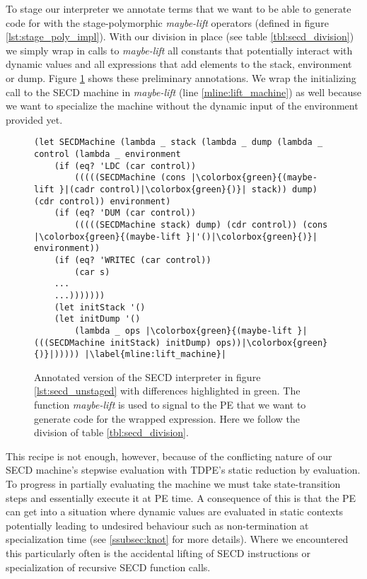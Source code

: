 \documentclass[a4paper,12pt,twoside,openright]{report}
\theoremstyle{definition}
\begin{document}
To stage our interpreter we annotate terms that we want to be able to generate code for with the stage-polymorphic \textit{maybe-lift} operators (defined in figure \ref{lst:stage_poly_impl}). With our division in place (see table \ref{tbl:secd_division}) we simply wrap in calls to \textit{maybe-lift} all constants that potentially interact with dynamic values and all expressions that add elements to the stack, environment or dump. Figure \ref{lst:secd_staged1} shows these preliminary annotations. We wrap the initializing call to the SECD machine in \textit{maybe-lift} (line \ref{mline:lift_machine}) as well because we want to specialize the machine without the dynamic input of the environment provided yet.

\begin{figure}[ht]
\centering
\begin{verbatim}
(let SECDMachine (lambda _ stack (lambda _ dump (lambda _ control (lambda _ environment
    (if (eq? 'LDC (car control))
        (((((SECDMachine (cons |\colorbox{green}{(maybe-lift }|(cadr control)|\colorbox{green}{)}| stack)) dump) (cdr control)) environment)
    (if (eq? 'DUM (car control))
        (((((SECDMachine stack) dump) (cdr control)) (cons |\colorbox{green}{(maybe-lift }|'()|\colorbox{green}{)}| environment))
    (if (eq? 'WRITEC (car control))
        (car s)
    ...
    ...)))))))
    (let initStack '()
    (let initDump '()
        (lambda _ ops |\colorbox{green}{(maybe-lift }|(((SECDMachine initStack) initDump) ops))|\colorbox{green}{)}|))))) |\label{mline:lift_machine}|
\end{verbatim}
\caption{Annotated version of the SECD interpreter in figure \ref{lst:secd_unstaged} with differences highlighted in green. The function \textit{maybe-lift} is used to signal to the PE that we want to generate code for the wrapped expression. Here we follow the division of table \ref{tbl:secd_division}.}
\label{lst:secd_staged1}
\end{figure}

This recipe is not enough, however, because of the conflicting nature of our SECD machine's stepwise evaluation with TDPE's static reduction by evaluation. To progress in partially evaluating the machine we must take state-transition steps and essentially execute it at PE time. A consequence of this is that the PE can get into a situation where dynamic values are evaluated in static contexts potentially leading to undesired behaviour such as non-termination at specialization time (see \ref{ssubsec:knot} for more details). Where we encountered this particularly often is the accidental lifting of SECD instructions or specialization of recursive SECD function calls.
\end{document}

